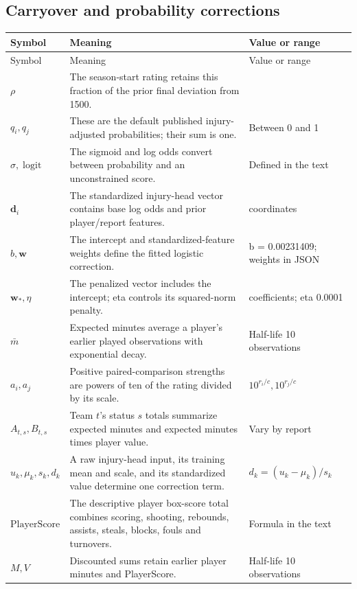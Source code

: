 \documentclass[11pt]{article}
\begin{document}
\clearpage
\subsection*{Carryover and probability corrections}
\begin{longtable}{@{}>{\raggedright\arraybackslash}p{}>{\raggedright\arraybackslash}p{}>{\raggedright\arraybackslash}p{}@{}}
\toprule
Symbol & Meaning & Value or range\\
\midrule
\endfirsthead
\toprule Symbol & Meaning & Value or range\\\midrule
\endhead
\bottomrule\endfoot
$\rho$ & The season-start rating retains this fraction of the prior final deviation from 1500. & 0.5\\
$q_i,q_j$ & These are the default published injury-adjusted probabilities; their sum is one. & Between 0 and 1\\
$\sigma,\operatorname{logit}$ & The sigmoid and log odds convert between probability and an unconstrained score. & Defined in the text\\
$\mathbf d_i$ & The standardized injury-head vector contains base log odds and prior player/report features. & 19 coordinates\\
$b,\mathbf w$ & The intercept and standardized-feature weights define the fitted logistic correction. & b = 0.00231409; weights in JSON\\
$\mathbf w_*,\eta$ & The penalized vector includes the intercept; eta controls its squared-norm penalty. & 20 coefficients; eta 0.0001\\
$\bar m$ & Expected minutes average a player's earlier played observations with exponential decay. & Half-life 10 observations\\
$a_i,a_j$ & Positive paired-comparison strengths are powers of ten of the rating divided by its scale. & $10^{r_i/c},10^{r_j/c}$\\
$A_{t,s},B_{t,s}$ & Team $t$'s status $s$ totals summarize expected minutes and expected minutes times player value. & Vary by report\\
$u_k,\mu_k,s_k,d_k$ & A raw injury-head input, its training mean and scale, and its standardized value determine one correction term. & $d_k=(u_k-\mu_k)/s_k$\\
$\mathrm{PlayerScore}$ & The descriptive player box-score total combines scoring, shooting, rebounds, assists, steals, blocks, fouls and turnovers. & Formula in the text\\
$M,V$ & Discounted sums retain earlier player minutes and PlayerScore. & Half-life 10 observations\\

\end{longtable}
\end{document}
